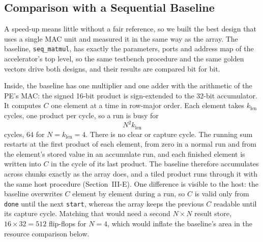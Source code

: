 
\subsection{Comparison with a Sequential Baseline}
A speed-up means little without a fair reference, so we built the best design that uses a single MAC unit and measured it in the same way as the array. The baseline, \texttt{seq\_matmul}, has exactly the parameters, ports and address map of the accelerator's top level, so the same testbench procedure and the same golden vectors drive both designs, and their results are compared bit for bit.

Inside, the baseline has one multiplier and one adder with the arithmetic of the PE's MAC: the signed 16-bit product is sign-extended to the 32-bit accumulator. It computes $C$ one element at a time in row-major order. Each element takes $k_{\mathrm{len}}$ cycles, one product per cycle, so a run is busy for
\begin{equation}
N^2 k_{\mathrm{len}}
\label{eq:basebusy}
\end{equation}
cycles, 64 for $N = k_{\mathrm{len}} = 4$. There is no clear or capture cycle. The running sum restarts at the first product of each element, from zero in a normal run and from the element's stored value in an accumulate run, and each finished element is written into $C$ in the cycle of its last product. The baseline therefore accumulates across chunks exactly as the array does, and a tiled product runs through it with the same host procedure (Section~III-E). One difference is visible to the host: the baseline overwrites $C$ element by element during a run, so $C$ is valid only from \texttt{done} until the next \texttt{start}, whereas the array keeps the previous $C$ readable until its capture cycle. Matching that would need a second $N \times N$ result store, $16 \times 32 = 512$ flip-flops for $N = 4$, which would inflate the baseline's area in the resource comparison below.

